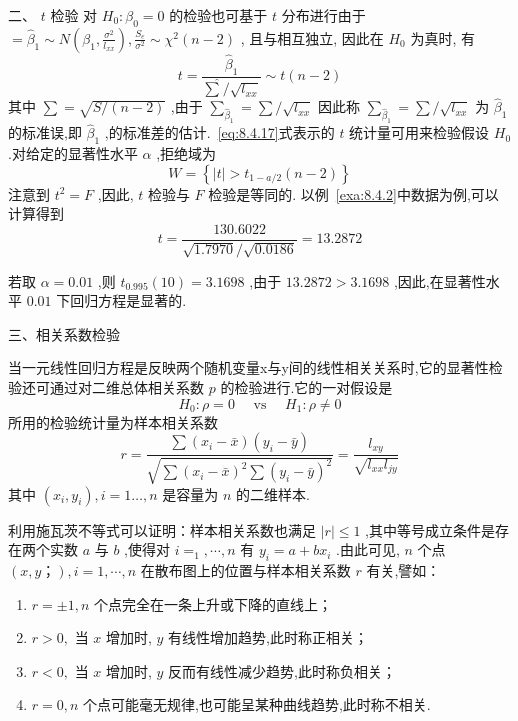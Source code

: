 二、 $t$ 检验
对 $H_0: \beta_0=0$ 的检验也可基于 $t$ 分布进行由于 $=\hat{\beta}_{1} \sim N\left(\beta_{1}, \frac{\sigma^{2}}{l_{x x}}\right), \frac{S_{e}}{\sigma^{2}} \sim \chi^{2}(n-2)$ , 且与相互独立, 因此在 $H_0$ 为真时, 有
\begin{equation}
t=\frac{\hat{\beta}_{1}}{\hat{\sum} / \sqrt{l_{x x}}} \sim t(n-2)\label{eq}
\end{equation}
其中 $\sum =\sqrt{S/(n-2)}$ ,由于 $\sum_{\hat{\beta}_1}=\sum/\sqrt{l_{xx}}$ 因此称 $\sum_{\hat{\beta}_1}=\sum/\sqrt{l_{xx}} $ 为 $\hat{\beta}_1$ 的标准误,即 $\hat{\beta}_1$ ,的标准差的估计.~\ref{eq:8.4.17}式表示的 $t$ 统计量可用来检验假设 $H_0$ .对给定的显著性水平 $\alpha$ ,拒绝域为
\begin{equation}
W=\left\{|t|>t_{1-a / 2}(n-2)\right\}
\end{equation}
注意到 $t^2=F$ ,因此, $t$ 检验与 $F$ 检验是等同的.
以例~\ref{exa:8.4.2}中数据为例,可以计算得到
\begin{equation}
t=\frac{130.6022}{\sqrt{1.7970} / \sqrt{0.0186}}=13.2872
\end{equation}

若取 $\alpha=0.01$ ,则 $t_{0.995}(10)=3.1698$ ,由于 $13.2872>3.1698$ ,因此,在显著性水平 $0.01$ 下回归方程是显著的.


三、相关系数检验

当一元线性回归方程是反映两个随机变量x与y间的线性相关关系时,它的显著性检验还可通过对二维总体相关系数 $p$ 的检验进行.它的一对假设是
\begin{equation}
H_{0} : \rho=0 \quad \text { vs } \quad H_{1} : \rho \neq 0
\end{equation}
所用的检验统计量为样本相关系数
\begin{equation}
r=\frac{\sum\left(x_{i}-\bar{x}\right)\left(y_{i}-\bar{y}\right)}{\sqrt{\sum\left(x_{i}-\bar{x}\right)^{2} \sum\left(y_{i}-\bar{y}\right)^{2}}}=\frac{l_{x y}}{\sqrt{l_{x x} l_{j y}}}
\end{equation}
其中 $(x_i,y_i),i=1…,n$ 是容量为 $n$ 的二维样本.

利用施瓦茨不等式可以证明：样本相关系数也满足  $\left| r \right|\le 1$ ,其中等号成立条件是存在两个实数 $a$ 与 $b$ ,使得对 $i=_1,\cdots,n$ 有 $y_i=a+bx_i$ .由此可见, $n$ 个点 $(x,y；),i=1,\cdots,n$ 在散布图上的位置与样本相关系数 $r$ 有关,譬如：

\begin{enumerate}
    \item  $r=\pm 1,n$ 个点完全在一条上升或下降的直线上；
    \item  $r>0 ,$ 当 $x$ 增加时, $y$ 有线性增加趋势,此时称正相关；
    \item  $r<0,$ 当 $x$ 增加时, $y$ 反而有线性减少趋势,此时称负相关；
    \item  $r=0,n$ 个点可能毫无规律,也可能呈某种曲线趋势,此时称不相关.
\end{enumerate}


